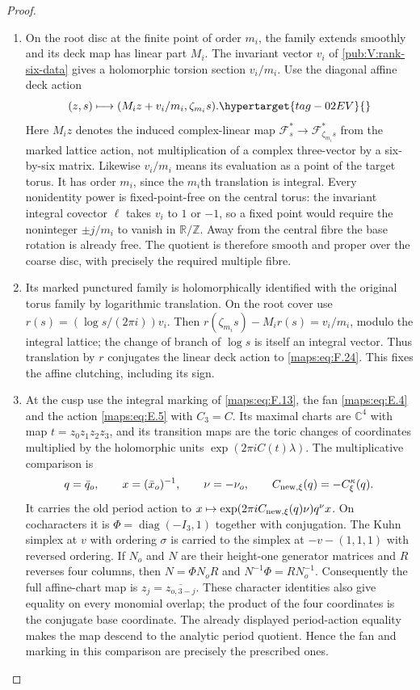 \documentclass[11pt,a4paper]{article}
\numberwithin{equation}{section}
\theoremstyle{definition}
\begin{document}
\begin{proof}
\begin{enumerate}[label=\arabic*.]
\item On the root disc at the finite point of order $m_i$, the family
extends smoothly and its deck map has linear part $M_i$.
The invariant vector $v_i$ of \cref{pub:V:rank-six-data} gives a holomorphic
torsion section $v_i/m_i$.  Use the diagonal affine deck action
\begin{equation}
 (z,s)\longmapsto(M_i z+v_i/m_i,\zeta_{m_i}s).
 \hypertarget{tag-02EV}{}\label{maps:eq:F.24}
\end{equation}
Here $M_i z$ denotes the induced complex-linear map
$\mathcal F_s^*\to\mathcal F_{\zeta_{m_i}s}^*$ from the marked
lattice action, not multiplication of a complex three-vector
by a six-by-six matrix.  Likewise $v_i/m_i$ means its evaluation
as a point of the target torus.
It has order $m_i$, since the $m_i$th translation is integral.
Every nonidentity power is fixed-point-free on the central
torus: the invariant integral covector $\ell$ takes $v_i$ to
$1$ or $-1$, so a fixed point would require the noninteger
$\pm j/m_i$ to vanish in $\mathbb R/\mathbb Z$.
Away from the central fibre the base rotation is already free.
The quotient is therefore smooth and proper over the coarse
disc, with precisely the required multiple fibre.

\item Its marked punctured family is holomorphically identified with
the original torus family by logarithmic translation.  On the
root cover use $r(s)=(\log s/(2\pi i))v_i$.  Then
$r(\zeta_{m_i}s)-M_i r(s)=v_i/m_i$, modulo the integral lattice;
the change of branch of $\log s$ is itself an integral vector.
Thus translation by $r$ conjugates the linear deck action to
\eqref{maps:eq:F.24}.  This fixes the affine clutching, including its sign.

\item At the cusp use the integral marking of \eqref{maps:eq:F.13}, the fan \eqref{maps:eq:E.4}
and the action \eqref{maps:eq:E.5} with $C_3=C$.
Its maximal charts are $\mathbb C^4$ with map
$t=z_0z_1z_2z_3$, and its transition maps are the toric changes
of coordinates multiplied by the holomorphic units
$\exp(2\pi i C(t)\lambda)$.
The multiplicative comparison is
\[
 q=\bar q_o,\qquad x=(\bar x_o)^{-1},\qquad
 \nu=-\nu_o,\qquad
 C_{{\rm new},\xi}(q)=-C^\kappa_\xi(q).
\]
It carries the old period action to
$x\mapsto\exp(2\pi iC_{{\rm new},\xi}(q)\nu)q^\nu x$.
On cocharacters it is
$\Phi=\operatorname{diag}(-I_3,1)$ together with conjugation.
The Kuhn simplex at $v$ with ordering $\sigma$ is carried to
the simplex at $-v-(1,1,1)$ with reversed ordering.
If $N_o$ and $N$ are their height-one generator matrices and
$R$ reverses four columns, then
$N=\Phi N_oR$ and $N^{-1}\Phi=RN_o^{-1}$.
Consequently the full affine-chart map is
$z_j=\overline{z_{o,3-j}}$.  These character identities also
give equality on every monomial overlap; the product of the
four coordinates is the conjugate base coordinate.
The already displayed period-action equality makes the map
descend to the analytic period quotient.  Hence the fan and
marking in this comparison are precisely the prescribed ones.


\end{enumerate}
\end{proof}
\end{document}
